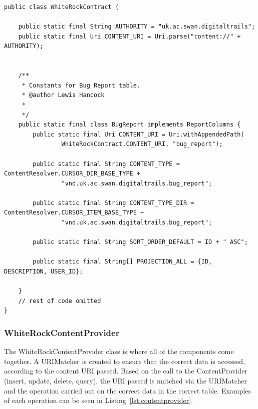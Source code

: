 \documentclass[11pt,a4paper]{article}
\begin{document}
\begin{lstlisting}[captionpos=b, caption=WhiteRockContract Snippet, label=lst:contract, frame=single]
public class WhiteRockContract {
	
	public static final String AUTHORITY = "uk.ac.swan.digitaltrails";
	public static final Uri CONTENT_URI = Uri.parse("content://" + AUTHORITY);


	/**
	 * Constants for Bug Report table.
	 * @author Lewis Hancock
	 *
	 */
	public static final class BugReport implements ReportColumns {
		public static final Uri CONTENT_URI = Uri.withAppendedPath(
				WhiteRockContract.CONTENT_URI, "bug_report");
	
		public static final String CONTENT_TYPE = ContentResolver.CURSOR_DIR_BASE_TYPE +
				"vnd.uk.ac.swan.digitaltrails.bug_report";
		
		public static final String CONTENT_TYPE_DIR = ContentResolver.CURSOR_ITEM_BASE_TYPE +
				"vnd.uk.ac.swan.digitaltrails.bug_report";
		
		public static final String SORT_ORDER_DEFAULT = ID + " ASC";
		
		public static final String[] PROJECTION_ALL = {ID, DESCRIPTION, USER_ID};

	}
	// rest of code omitted
}
\end{lstlisting}


\subsubsection{WhiteRockContentProvider}
The WhiteRockContentProvider class is where all of the components come together. A URIMatcher is created to ensure that the correct data is accessed, according to the content URI passed. Based on the call to the ContentProvider (insert, update, delete, query), the URI passed is matched via the URIMatcher and the operation carried out on the correct data in the correct table. Examples of each operation can be seen in Listing~\ref{lst:contentprovider}.
\end{document}
